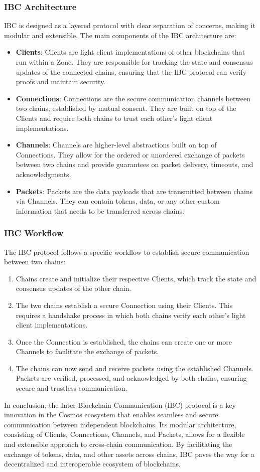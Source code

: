 \documentclass{article}
\begin{document}
\subsubsection{IBC Architecture}
%
IBC is designed as a layered protocol with clear separation of concerns, making it modular and extensible. The main components of the IBC architecture are:
%
\begin{itemize}
\item \textbf{Clients}: Clients are light client implementations of other blockchains that run within a Zone. They are responsible for tracking the state and consensus updates of the connected chains, ensuring that the IBC protocol can verify proofs and maintain security.
\item \textbf{Connections}: Connections are the secure communication channels between two chains, established by mutual consent. They are built on top of the Clients and require both chains to trust each other's light client implementations.
\item \textbf{Channels}: Channels are higher-level abstractions built on top of Connections. They allow for the ordered or unordered exchange of packets between two chains and provide guarantees on packet delivery, timeouts, and acknowledgments.
\item \textbf{Packets}: Packets are the data payloads that are transmitted between chains via Channels. They can contain tokens, data, or any other custom information that needs to be transferred across chains.
\end{itemize}
%
\subsubsection{IBC Workflow}
%
The IBC protocol follows a specific workflow to establish secure communication between two chains:
%
\begin{enumerate}
\item Chains create and initialize their respective Clients, which track the state and consensus updates of the other chain.
\item The two chains establish a secure Connection using their Clients. This requires a handshake process in which both chains verify each other's light client implementations.
\item Once the Connection is established, the chains can create one or more Channels to facilitate the exchange of packets.
\item The chains can now send and receive packets using the established Channels. Packets are verified, processed, and acknowledged by both chains, ensuring secure and trustless communication.
\end{enumerate}
%
In conclusion, the Inter-Blockchain Communication (IBC) protocol is a key innovation in the Cosmos ecosystem that enables seamless and secure communication between independent blockchains. Its modular architecture, consisting of Clients, Connections, Channels, and Packets, allows for a flexible and extensible approach to cross-chain communication. By facilitating the exchange of tokens, data, and other assets across chains, IBC paves the way for a decentralized and interoperable ecosystem of blockchains.
%
\end{document}
